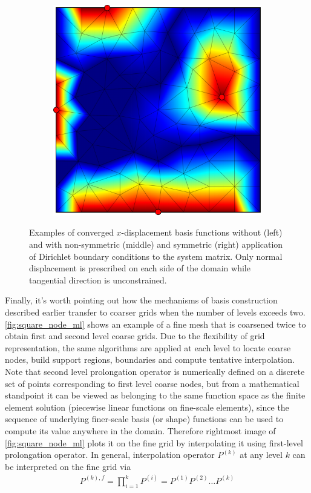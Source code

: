 \begin{figure}[htbp]
\begin{subfigure}[t]{0.3\textwidth}
  \end{subfigure}
  \hfill
  \begin{subfigure}[t]{0.3\textwidth}
    \centerline{\includegraphics[width=0.9\linewidth]{figs/square_tria_metis_node_conv_bc_symm}}
  \end{subfigure}
  \caption[Nodal basis function with boundary condition effects]{\label{fig:square_node_bc} Examples of converged $x$-displacement basis functions without (left) and with non-symmetric (middle) and symmetric (right) application of Dirichlet boundary conditions to the system matrix.   Only normal displacement is prescribed on each side of the domain while tangential direction is unconstrained.}
\end{figure}

Finally, it's worth pointing out how the mechanisms of basis construction described earlier transfer to coarser grids when the number of levels exceeds two.   \autoref{fig:square_node_ml} shows an example of a fine mesh that is coarsened twice to obtain first and second level coarse grids.   Due to the flexibility of grid representation, the same algorithms are applied at each level to locate coarse nodes, build support regions, boundaries and compute tentative interpolation.   Note that second level prolongation operator is numerically defined on a discrete set of points corresponding to first level coarse nodes, but from a mathematical standpoint it can be viewed as belonging to the same function space as the finite element solution (piecewise linear functions on fine-scale elements), since the sequence of underlying finer-scale basis (or shape) functions can be used to compute its value anywhere in the domain.    Therefore rightmost image of \autoref{fig:square_node_ml} plots it on the fine grid by interpolating it using first-level prolongation operator.    In general, interpolation operator $P^{(k)}$ at any level $k$ can be interpreted on the fine grid via 
\begin{align}
    P^{(k),f} = \prod\limits_{i=1}^{k}P^{(i)} = P^{(1)}P^{(2)} \ldots P^{(k)}
\end{align}

